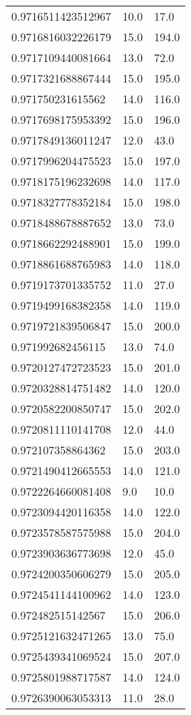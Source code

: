\begin{center}
\begin{supertabular}[H]{p{0.30\textwidth}p{0.05\textwidth}p{0.05\textwidth}}
0.9716511423512967 & 10.0 & 17.0 \\ 
0.9716816032226179 & 15.0 & 194.0 \\ 
0.9717109440081664 & 13.0 & 72.0 \\ 
0.9717321688867444 & 15.0 & 195.0 \\ 
0.971750231615562 & 14.0 & 116.0 \\ 
0.9717698175953392 & 15.0 & 196.0 \\ 
0.9717849136011247 & 12.0 & 43.0 \\ 
0.9717996204475523 & 15.0 & 197.0 \\ 
0.9718175196232698 & 14.0 & 117.0 \\ 
0.9718327778352184 & 15.0 & 198.0 \\ 
0.9718488678887652 & 13.0 & 73.0 \\ 
0.9718662292488901 & 15.0 & 199.0 \\ 
0.9718861688765983 & 14.0 & 118.0 \\ 
0.9719173701335752 & 11.0 & 27.0 \\ 
0.9719499168382358 & 14.0 & 119.0 \\ 
0.9719721839506847 & 15.0 & 200.0 \\ 
0.971992682456115 & 13.0 & 74.0 \\ 
0.9720127472723523 & 15.0 & 201.0 \\ 
0.9720328814751482 & 14.0 & 120.0 \\ 
0.9720582200850747 & 15.0 & 202.0 \\ 
0.9720811110141708 & 12.0 & 44.0 \\ 
0.972107358864362 & 15.0 & 203.0 \\ 
0.9721490412665553 & 14.0 & 121.0 \\ 
0.9722264660081408 & 9.0 & 10.0 \\ 
0.9723094420116358 & 14.0 & 122.0 \\ 
0.9723578587575988 & 15.0 & 204.0 \\ 
0.9723903636773698 & 12.0 & 45.0 \\ 
0.9724200350606279 & 15.0 & 205.0 \\ 
0.9724541144100962 & 14.0 & 123.0 \\ 
0.972482515142567 & 15.0 & 206.0 \\ 
0.9725121632471265 & 13.0 & 75.0 \\ 
0.9725439341069524 & 15.0 & 207.0 \\ 
0.9725801988717587 & 14.0 & 124.0 \\ 
0.9726390063053313 & 11.0 & 28.0 \\ 

\end{supertabular}
\end{center}
